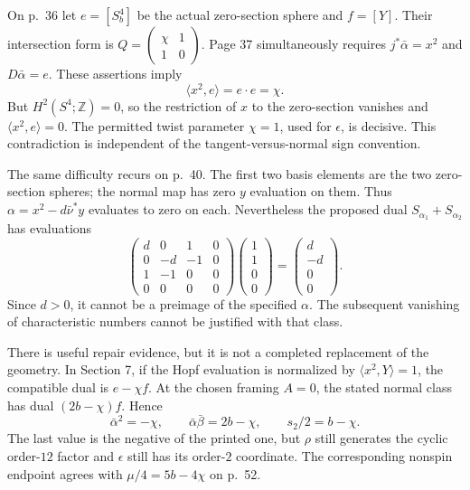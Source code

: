 \documentclass[10pt]{article}
\begin{document}
On p. 36 let \(e=[S_b^4]\) be the actual zero-section sphere and \(f=[Y]\). Their intersection form is \(Q=\left(\begin{smallmatrix}\chi&1\\1&0\end{smallmatrix}\right)\). Page 37 simultaneously requires \(j^*\bar\alpha=x^2\) and \(D\bar\alpha=e\). These assertions imply \[\langle x^2,e\rangle=e\cdot e=\chi .\] But \(H^2(S^4;\mathbb Z)=0\), so the restriction of \(x\) to the zero-section vanishes and \(\langle x^2,e\rangle=0\). The permitted twist parameter \(\chi=1\), used for \(\epsilon\), is decisive. This contradiction is independent of the tangent-versus-normal sign convention.\par
The same difficulty recurs on p. 40. The first two basis elements are the two zero-section spheres; the normal map has zero \(y\) evaluation on them. Thus \(\alpha=x^2-d\bar\nu^*y\) evaluates to zero on each. Nevertheless the proposed dual \(S_{\alpha_1}+S_{\alpha_2}\) has evaluations \[\begin{pmatrix}d&0&1&0\\0&-d&-1&0\\1&-1&0&0\\0&0&0&0\end{pmatrix}
 \begin{pmatrix}1\\1\\0\\0\end{pmatrix}
 =\begin{pmatrix}d\\-d\\0\\0\end{pmatrix}.\] Since \(d>0\), it cannot be a preimage of the specified \(\alpha\). The subsequent vanishing of characteristic numbers cannot be justified with that class.\par
There is useful repair evidence, but it is not a completed replacement of the geometry. In Section 7, if the Hopf evaluation is normalized by \(\langle x^2,Y\rangle=1\), the compatible dual is \(e-\chi f\). At the chosen framing \(A=0\), the stated normal class has dual \((2b-\chi)f\). Hence \[\bar\alpha^2=-\chi,\qquad
 \bar\alpha\bar\beta=2b-\chi,\qquad s_2/2=b-\chi .\] The last value is the negative of the printed one, but \(\rho\) still generates the cyclic order-\(12\) factor and \(\epsilon\) still has its order-\(2\) coordinate. The corresponding nonspin endpoint agrees with \(\mu/4=5b-4\chi\) on p. 52.\par
\end{document}
